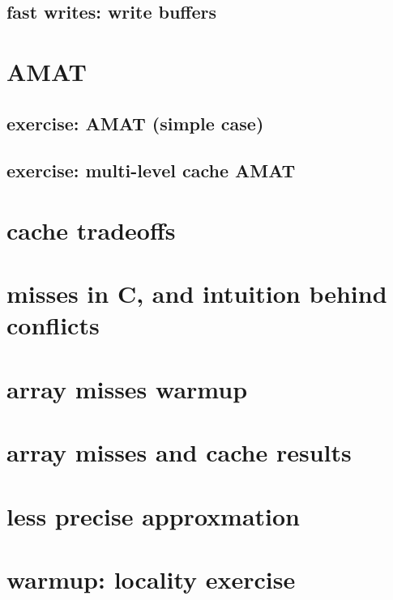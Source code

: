\subsection{fast writes: write buffers}


\section{AMAT}


\subsection{exercise: AMAT (simple case)}


\subsection{exercise: multi-level cache AMAT}


\section{cache tradeoffs}


\section{misses in C, and intuition behind conflicts}


\section{array misses warmup}


\section{array misses and cache results}


\section{less precise approxmation}


\section{warmup: locality exercise}  %


